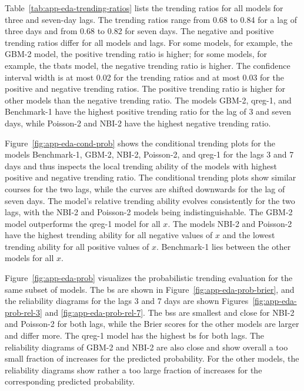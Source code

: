 Table~\ref{tab:app-eda-trending-ratios} lists the trending ratios for all models for three and seven-day lags.
The trending ratios range from 0.68 to 0.84 for a lag of three days and from 0.68 to 0.82 for seven days.
The negative and positive trending ratios differ for all models and lags.
For some models, for example, the GBM-2 model, the positive trending ratio is higher; for some models, for example, the tbats model, the negative trending ratio is higher.
The confidence interval width is at most 0.02 for the trending ratios and at most 0.03 for the positive and negative trending ratios.
The positive trending ratio is higher for other models than the negative trending ratio.
The models GBM-2, qreg-1, and Benchmark-1 have the highest positive trending ratio for the lag of 3 and seven days, while Poisson-2 and NBI-2 have the highest negative trending ratio.

Figure~\ref{fig:app-eda-cond-prob} shows the conditional trending plots for the models Benchmark-1, GBM-2, NBI-2, Poisson-2, and qreg-1 for the lags 3 and 7 days and thus inspects the local trending ability of the models with highest positive and negative trending ratio.
The conditional trending plots show similar courses for the two lags, while the curves are shifted downwards for the lag of seven days.
The model's relative trending ability evolves consistently for the two lags, with the NBI-2 and Poisson-2 models being indistinguishable.
The GBM-2 model outperforms the qreg-1 model for all $x$.
The models NBI-2 and Poisson-2 have the highest trending ability for all negative values of $x$ and the lowest trending ability for all positive values of $x$.
Benchmark-1 lies between the other models for all $x$.

Figure~\ref{fig:app-eda-prob} visualizes the probabilistic trending evaluation for the same subset of models.
The \acf{bs} are shown in Figure~\ref{fig:app-eda-prob-brier}, and the reliability diagrams for the lags 3 and 7 days are shown Figures~\ref{fig:app-eda-prob-rel-3} and \ref{fig:app-eda-prob-rel-7}.
The \acp{bs} are smallest and close for NBI-2 and Poisson-2 for both lags, while the Brier scores for the other models are larger and differ more.
The qreg-1 model has the highest \ac{bs} for both lags.
The reliability diagrams of GBM-2 and NBI-2 are also close and show overall a too small fraction of increases for the predicted probability.
For the other models, the reliability diagrams show rather a too large fraction of increases for the corresponding predicted probability.

